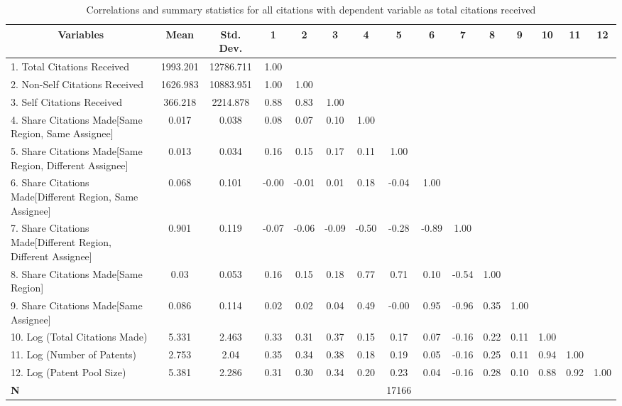\begin{sidewaystable}[htbp]\centering \caption{Correlations and summary statistics for all citations  with dependent variable as total citations received\label{a.e.o.t.n.tcorrelation}}
\scriptsize
\onehalfspacing
\begin{tabular}{l  c  c  c  c  c  c  c  c  c  c  c  c  c  c }\hline\hline
\multicolumn{1}{c}{Variables} & \textbf{Mean}& \textbf{Std. Dev.}&1&2&3&4&5&6&7&8&9&10&11&12\\ \hline
1. Total Citations Received& 1993.201 & 12786.711&1.00\\
2. Non-Self Citations Received& 1626.983 & 10883.951&1.00&1.00\\
3. Self Citations Received& 366.218 & 2214.878&0.88&0.83&1.00\\
4. Share Citations Made[Same Region, Same Assignee]& 0.017 & 0.038&0.08&0.07&0.10&1.00\\
5. Share Citations Made[Same Region, Different Assignee]& 0.013 & 0.034&0.16&0.15&0.17&0.11&1.00\\
6. Share Citations Made[Different Region, Same Assignee]& 0.068 & 0.101&-0.00&-0.01&0.01&0.18&-0.04&1.00\\
7. Share Citations Made[Different Region, Different Assignee]& 0.901 & 0.119&-0.07&-0.06&-0.09&-0.50&-0.28&-0.89&1.00\\
8. Share Citations Made[Same Region]& 0.03 & 0.053&0.16&0.15&0.18&0.77&0.71&0.10&-0.54&1.00\\
9. Share Citations Made[Same Assignee]& 0.086 & 0.114&0.02&0.02&0.04&0.49&-0.00&0.95&-0.96&0.35&1.00\\
10. Log (Total Citations Made) & 5.331 & 2.463&0.33&0.31&0.37&0.15&0.17&0.07&-0.16&0.22&0.11&1.00\\
11. Log (Number of Patents)& 2.753 & 2.04&0.35&0.34&0.38&0.18&0.19&0.05&-0.16&0.25&0.11&0.94&1.00\\
12. Log (Patent Pool Size)& 5.381 & 2.286&0.31&0.30&0.34&0.20&0.23&0.04&-0.16&0.28&0.10&0.88&0.92&1.00\\
\hline
\textbf{N}&&&&&&&17166\\
\hline \hline 
 \end{tabular}
\end{sidewaystable}
